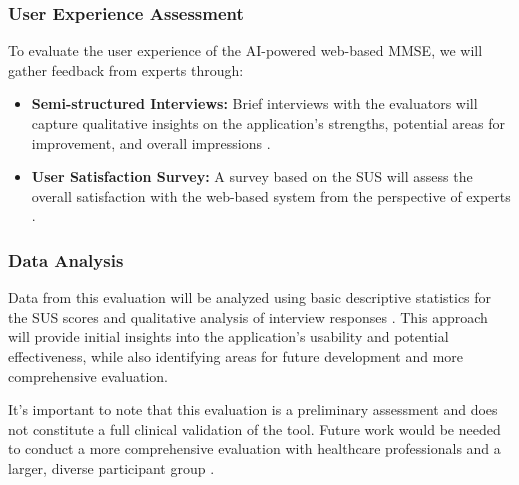 \subsubsection{User Experience Assessment}
To evaluate the user experience of the AI-powered web-based MMSE, we will gather feedback from experts through:
\begin{itemize}
\item \textbf{Semi-structured Interviews:} Brief interviews with the evaluators will capture qualitative insights on the application's strengths, potential areas for improvement, and overall impressions \cite{Wild2021}.
\item \textbf{User Satisfaction Survey:} A survey based on the SUS will assess the overall satisfaction with the web-based system from the perspective of experts \cite{Brooke1996}.
\end{itemize}

\subsubsection{Data Analysis}
Data from this evaluation will be analyzed using basic descriptive statistics for the SUS scores and qualitative analysis of interview responses \cite{Braun2006}. This approach will provide initial insights into the application's usability and potential effectiveness, while also identifying areas for future development and more comprehensive evaluation.

It's important to note that this evaluation is a preliminary assessment and does not constitute a full clinical validation of the tool. Future work would be needed to conduct a more comprehensive evaluation with healthcare professionals and a larger, diverse participant group \cite{Geddes2020}.
